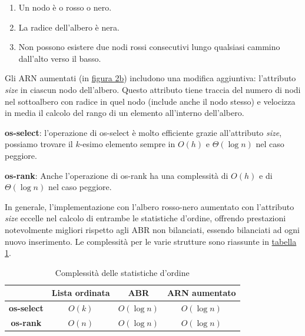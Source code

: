 \documentclass[onecolumn]{article}
\begin{document}
\begin{enumerate}
	\setlength\itemsep{-0.25em}
	\item Un nodo è o rosso o nero.
	\item La radice dell'albero è nera.
	\item Non possono esistere due nodi rossi consecutivi lungo qualsiasi cammino dall'alto verso il basso.
\end{enumerate}

Gli ARN aumentati (in \hyperref[fig:alberi]{figura 2b}) includono una modifica aggiuntiva: l'attributo \textit{size} in ciascun nodo dell'albero. Questo attributo tiene traccia del numero di nodi nel sottoalbero con radice in quel nodo (include anche il nodo stesso) e velocizza in media il calcolo del rango di un elemento all'interno dell'albero. \vspace{1em}

\textbf{os-select}: l'operazione di os-select è molto efficiente grazie all'attributo \textit{size}, possiamo trovare il $k$-esimo elemento sempre in $O(h)$ e $\Theta(\log n)$ nel caso peggiore. \vspace{0.5em}

\textbf{os-rank}: Anche l'operazione di os-rank ha una complessità di $O(h)$ e di $\Theta(\log n)$ nel caso peggiore. \vspace{1em}

In generale, l'implementazione con l'albero rosso-nero aumentato con l'attributo \textit{size} eccelle nel calcolo di entrambe le statistiche d'ordine, offrendo prestazioni notevolmente migliori rispetto agli ABR non bilanciati, essendo bilanciati ad ogni nuovo inserimento. Le complessità per le varie strutture sono riassunte in \hyperref[tab:complessita]{tabella 1}.

\begin{table}[t]
	\centering
	\begin{tabular}{|c|c|c|c|}
		\hline
		& Lista ordinata & \hspace*{2em}ABR\hspace*{2em} & ARN aumentato \\
		\hline
		\textbf{os-select} & $O(k)$         & $O(\log n)$                   & $O(\log n)$   \\
		\hline
		\textbf{os-rank}   & $O(n)$         & $O(\log n)$                   & $O(\log n)$   \\
		\hline
	\end{tabular}
	\caption{Complessità delle statistiche d'ordine}
	\label{tab:complessita}
\end{table}
\end{document}
